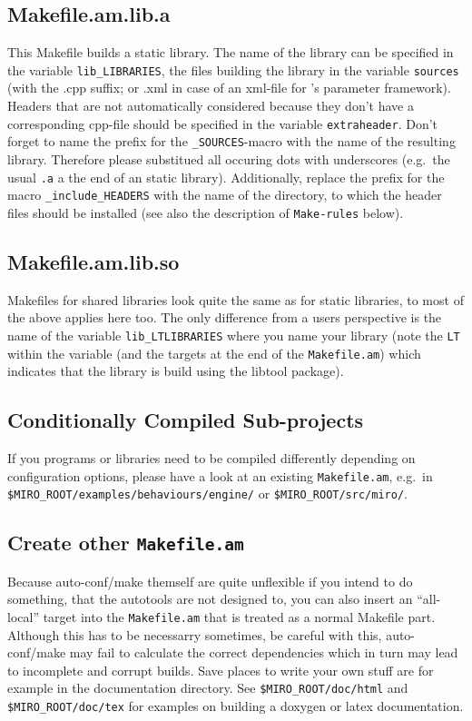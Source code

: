 \subsection{Makefile.am.lib.a}
This Makefile builds a static library. The name of the library can be
specified in the variable \texttt{lib\_LIBRARIES}, the files building
the library in the variable \texttt{sources} (with the .cpp suffix; or
.xml in case of an xml-file for \miro's parameter framework). Headers
that are not automatically considered because they don't have a
corresponding cpp-file should be specified in the variable
\texttt{extraheader}. Don't forget to name the prefix for the
\texttt{\_SOURCES}-macro with the name of the resulting library.
Therefore please substitued all occuring dots with underscores (e.g.\ 
the usual \texttt{.a} a the end of an static library).  Additionally,
replace the prefix for the macro \texttt{\_include\_HEADERS} with the
name of the directory, to which the header files should be installed
(see also the description of \texttt{Make-rules} below).

\subsection{Makefile.am.lib.so}
Makefiles for shared libraries look quite the same as for static
libraries, to most of the above applies here too. The only difference
from a users perspective is the name of the variable
\texttt{lib\_LTLIBRARIES} where you name your library (note the
\texttt{LT} within the variable (and the targets at the end of the
\texttt{Makefile.am}) which indicates that the library is build using
the libtool package).

\subsection{Conditionally Compiled Sub-projects}

If you programs or libraries need to be compiled differently depending
on configuration options, please have a look at an existing
\texttt{Makefile.am}, e.g.\ in
\texttt{\$MIRO\_ROOT/\-examples/\-behaviours/\-engine/} or
\texttt{\$MIRO\_ROOT/\-src/\-miro/}.

\subsection{Create other {\tt Makefile.am}}

Because auto-conf/\-make themself are quite unflexible if you intend to
do something, that the autotools are not designed to, you can also
insert an "`all-local"' target into the {\tt Makefile.am} that is
treated as a normal Makefile part. Although this has to be necessarry
sometimes, be careful with this, auto-conf/make may fail to calculate
the correct dependencies which in turn may lead to incomplete and
corrupt builds. Save places to write your own stuff are for example in
the documentation directory. See {\tt \$MIRO\_ROOT/\-doc/\-html} and {\tt
\$MIRO\_ROOT/\-doc/\-tex} for examples on building a doxygen or latex
documentation.

